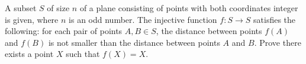 A subset $S$ of size $n$ of a plane consisting of points with both coordinates integer is given, where $n$ is an odd number. The injective function $f\colon S\rightarrow S$ satisfies the following: for each pair of points $A, B\in S$, the distance between points $f(A)$ and $f(B)$ is not smaller than the distance between points $A$ and $B$. Prove there exists a point $X$ such that $f(X)=X$.